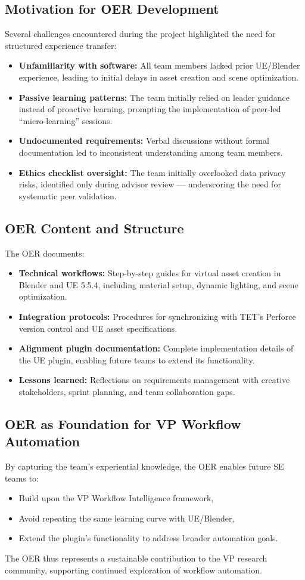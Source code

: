 \documentclass[12pt,a4paper]{report}
\begin{document}
\subsection{Motivation for OER Development}
Several challenges encountered during the project highlighted the need for structured experience transfer:
\begin{itemize}
    \item \textbf{Unfamiliarity with software:} All team members lacked prior UE/Blender experience, leading to initial delays in asset creation and scene optimization.
    \item \textbf{Passive learning patterns:} The team initially relied on leader guidance instead of proactive learning, prompting the implementation of peer-led ``micro-learning'' sessions.
    \item \textbf{Undocumented requirements:} Verbal discussions without formal documentation led to inconsistent understanding among team members.
    \item \textbf{Ethics checklist oversight:} The team initially overlooked data privacy risks, identified only during advisor review — underscoring the need for systematic peer validation.
\end{itemize}

\subsection{OER Content and Structure}
The OER documents:
\begin{itemize}
    \item \textbf{Technical workflows:} Step-by-step guides for virtual asset creation in Blender and UE 5.5.4, including material setup, dynamic lighting, and scene optimization.
    \item \textbf{Integration protocols:} Procedures for synchronizing with TET's Perforce version control and UE asset specifications.
    \item \textbf{Alignment plugin documentation:} Complete implementation details of the UE plugin, enabling future teams to extend its functionality.
    \item \textbf{Lessons learned:} Reflections on requirements management with creative stakeholders, sprint planning, and team collaboration gaps.
\end{itemize}

\subsection{OER as Foundation for VP Workflow Automation}
By capturing the team's experiential knowledge, the OER enables future SE teams to:
\begin{itemize}
    \item Build upon the VP Workflow Intelligence framework,
    \item Avoid repeating the same learning curve with UE/Blender,
    \item Extend the plugin's functionality to address broader automation goals.
\end{itemize}
The OER thus represents a sustainable contribution to the VP research community, supporting continued exploration of workflow automation.
\end{document}
